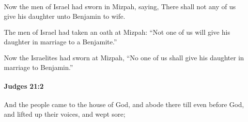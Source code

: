 			\begin{versebox}
					\item[BHS] 
					\item[ASV] Now the men of Israel had sworn in Mizpah, saying, There shall not any of us give his daughter unto Benjamin to wife.
					\item[NIV] The men of Israel had taken an oath at Mizpah: “Not one of us will give his daughter in marriage to a Benjamite.”
					\item[NRSV] Now the Israelites had sworn at Mizpah, “No one of us shall give his daughter in marriage to Benjamin.”
			\end{versebox}

		\paragraph{Judges 21:2} %
			\label{JUDGES-21-2}

			And the people came to the house of God, and abode there till even before God, and lifted up their voices, and wept sore;

